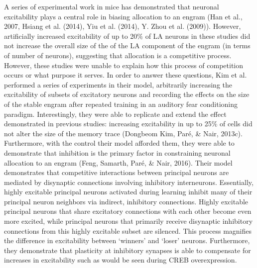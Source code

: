 \documentclass[12pt,a4paperpaper,]{report}
\begin{document}
A series of experimental work in mice has demonstrated that neuronal
excitability plays a central role in biasing allocation to an engram
(Han et al., 2007, Hsiang et al. (2014), Yiu et al. (2014), Y. Zhou et
al. (2009)). However, artificially increased excitability of up to 20\%
of LA neurons in these studies did not increase the overall size of the
of the LA component of the engram (in terms of number of neurons),
suggesting that allocation is a competitive process. However, these
studies were unable to explain how this process of competition occurs or
what purpose it serves. In order to answer these questions, Kim et al.
performed a series of experiments in their model, arbitrarily increasing
the excitability of subsets of excitatory neurons and recording the
effects on the size of the stable engram after repeated training in an
auditory fear conditioning paradigm. Interestingly, they were able to
replicate and extend the effect demonstrated in previous studies:
increasing excitability in up to 25\% of cells did not alter the size of
the memory trace (Dongbeom Kim, Paré, \& Nair, 2013c). Furthermore, with
the control their model afforded them, they were able to demonstrate
that inhibition is the primary factor in constraining neuronal
allocation to an engram (Feng, Samarth, Paré, \& Nair, 2016). Their
model demonstrates that competitive interactions between principal
neurons are mediated by disynaptic connections involving inhibitory
interneurons. Essentially, highly excitable principal neurons activated
during learning inhibit many of their principal neuron neighbors via
indirect, inhibitory connections. Highly excitable principal neurons
that share excitatory connections with each other become even more
excited, while principal neurons that primarily receive disynaptic
inhibitory connections from this highly excitable subset are silenced.
This process magnifies the difference in excitability between `winners'
and `loser' neurons. Furthermore, they demonstrate that plasticity at
inhibitory synapses is able to compensate for increases in excitability
such as would be seen during CREB overexpression.
\end{document}
